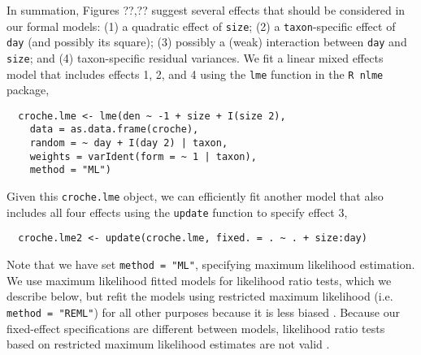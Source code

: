 \documentclass[12pt]{ecologyFORAPPENDIX}
\begin{document}
In summation, Figures ??,?? suggest several effects that should be considered in our formal models: (1) a quadratic effect of \texttt{size}; (2) a \texttt{taxon}-specific effect of \texttt{day} (and possibly its square); (3) possibly a (weak) interaction between \texttt{day} and \texttt{size}; and (4) taxon-specific residual variances.  We fit a linear mixed effects model that includes effects 1, 2, and 4 using the \texttt{lme} function in the \texttt{R nlme} package,
\vspace{-12pt}
\singlespace 
\begin{verbatim}
  croche.lme <- lme(den ~ -1 + size + I(size 2),
    data = as.data.frame(croche),
    random = ~ day + I(day 2) | taxon,
    weights = varIdent(form = ~ 1 | taxon),
    method = "ML")
\end{verbatim}
\doublespace
Given this \texttt{croche.lme} object, we can efficiently fit another model that also includes all four effects using the \texttt{update} function to specify effect 3,
\begin{verbatim}
  croche.lme2 <- update(croche.lme, fixed. = . ~ . + size:day)
\end{verbatim}
Note that we have set \texttt{method = "ML"}, specifying maximum likelihood estimation.  We use maximum likelihood fitted models for likelihood ratio tests, which we describe below, but refit the models using restricted maximum likelihood (i.e. \texttt{method = "REML"}) for all other purposes because it is less biased \citep{PinheiroAndBates2000}.  Because our fixed-effect specifications are different between models, likelihood ratio tests based on restricted maximum likelihood estimates are not valid \citep{PinheiroAndBates2000}.







\end{document}
